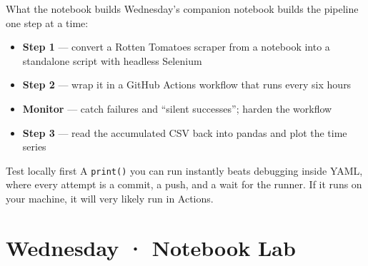 \documentclass[9pt,aspectratio=169]{beamer}
\begin{document}
\begin{frame}{What the notebook builds}
    Wednesday's companion notebook builds the pipeline one step at a time:
    \begin{itemize}
        \item \textbf{Step 1} --- convert a Rotten Tomatoes scraper from a notebook into a standalone script with headless Selenium
        \item \textbf{Step 2} --- wrap it in a GitHub Actions workflow that runs every six hours
        \item \textbf{Monitor} --- catch failures and ``silent successes''; harden the workflow
        \item \textbf{Step 3} --- read the accumulated CSV back into pandas and plot the time series
    \end{itemize}

    \vspace{1em}

    \begin{alertblock}{Test locally first}
        A \texttt{print()} you can run instantly beats debugging inside YAML, where every attempt is a commit, a push, and a wait for the runner. If it runs on your machine, it will very likely run in Actions.
    \end{alertblock}
\end{frame}

\section{Wednesday · Notebook Lab}
\end{document}
